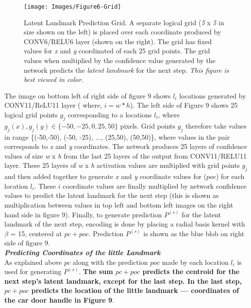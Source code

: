 \documentclass [11pt,letterpaper ,twoside ,openany ]{report}
\begin{document}
    \begin{figure}[t]
      \centering
      \texttt{[image: Images/Figure6-Grid]}
      \caption{Latent Landmark Prediction Grid. A separate logical grid (\textit{5} x \textit{5} in size shown on the left) is placed over each coordinate produced by CONV6/RELU6 layer (shown on the right). The grid has fixed values for \textit{x} and \textit{y} coordinated of each 25 grid points. The grid values when multiplied by the confidence value generated by the network predicts the \textit{latent landmark} for the next step. \textit{This figure is best viewed in color.}}
      \label{fig:grid}
    \end{figure}

    The image on bottom left of right side of figure 9 shows \(l_i\) locations generated by CONV11/ReLU11 layer ( where, \( i = w * h\)). The left side of Figure 9 shows 25 logical grid points \(g_j\) corresponding to a locations \(l_i\), where \(g_j(x), g_j(y) \in \{-50, -25, 0, 25, 50\} \) pixels. Grid points \(g_j\) therefore take values in range \{(-50,-50), (-50, -25), ..., (25,50), (50,50)\}, where values in the pair corresponds to \textit{x} and \textit{y} coordinates. The network produces 25 layers of confidence values of size \textit {w} x \textit {h} from the last 25 layers of the output from CONV11/RELU11 layer. These 25 layers of \textit {w} x \textit {h} activation values are multiplied with grid points \(g_j\) and then added together to generate \textit{x} and \textit{y} coordinate values for (\( poc \)) for each location \(l_i\). These \(i\) coordinate values are finally multiplied by network confidence values to predict the latent landmark for the next step (this is shown as multiplication between values in top left and bottom left images on the right hand side in figure 9).  Finally, to generate prediction \(P^{(s)} \) for the latent landmark of the next step, encoding is done by placing a radial basis kernel with \(\beta \) = 15, centered at \( pc + poc \). Prediction \(P^{(s)} \) is shown as the blue blob on right side of figure 9.\\

    \noindent
    \textbf{\textit{Predicting Coordinates of the little Landmark}}\\
    As explained above \(pc \) along with the prediction \(poc\) made by each location \(l_i\) is used for generating \(P^{(s)}\). \textbf{The sum \(pc + poc\) predicts the centroid for the next step's latent landmark, except for the last step. In the last step, \(pc + poc\) predicts the location of the little landmark --- coordinates of the car door handle in Figure 9}.\\
\end{document}
